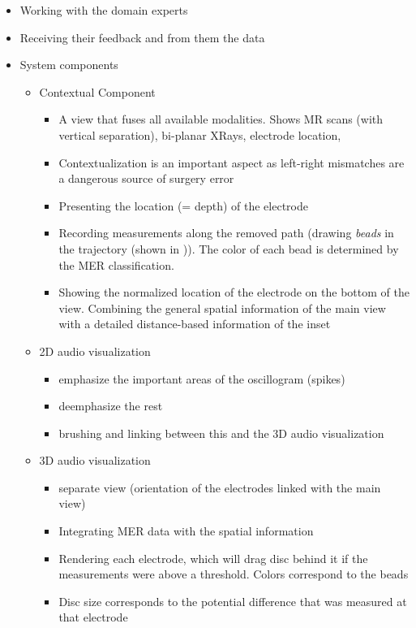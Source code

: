 \begin{itemize}
\item Working with the domain experts
\item Receiving their feedback and from them the data
\item System components
\begin{itemize}
    \item Contextual Component
    \begin{itemize}
        \item A  view that fuses all available modalities. Shows MR scans (with vertical separation), bi-planar XRays, electrode location,
        \item Contextualization is an important aspect as left-right mismatches are a dangerous source of surgery error
        \item Presenting the location (= depth) of the electrode
        \item Recording measurements along the removed path (drawing \emph{beads} in the trajectory (shown in \cite{Haese2005} \cite{Miocinovic2007})). The color of each bead is determined by the MER classification.
        \item Showing the normalized location of the electrode on the bottom of the view. Combining the general spatial information of the main view with a detailed distance-based information of the inset
    \end{itemize}
    \item 2D audio visualization
    \begin{itemize}
        \item emphasize the important areas of the oscillogram (spikes)
        \item deemphasize the rest
        \item brushing and linking between this and the 3D audio visualization
    \end{itemize}
    \item 3D audio visualization
    \begin{itemize}
        \item separate view (orientation of the electrodes linked with the main view)
        \item Integrating MER data with the spatial information
        \item Rendering each electrode, which will drag disc behind it if the measurements were above a threshold. Colors correspond to the beads
        \item Disc size corresponds to the potential difference that was measured at that electrode

\end{itemize}
\end{itemize}
\end{itemize}
